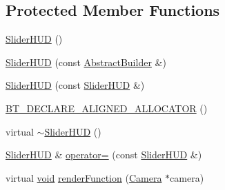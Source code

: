 \subsection*{Protected Member Functions}
\begin{DoxyCompactItemize}
\item 
\mbox{\hyperlink{classnjli_1_1_slider_h_u_d_a8cc2cb200f5a52bd7f4d5f1520a08524}{Slider\+H\+UD}} ()
\item 
\mbox{\hyperlink{classnjli_1_1_slider_h_u_d_a2ea762c03a7585d4e5c6d2aa3a23692a}{Slider\+H\+UD}} (const \mbox{\hyperlink{classnjli_1_1_abstract_builder}{Abstract\+Builder}} \&)
\item 
\mbox{\hyperlink{classnjli_1_1_slider_h_u_d_adb10bba5954a63dc1b6c0a0c22b41899}{Slider\+H\+UD}} (const \mbox{\hyperlink{classnjli_1_1_slider_h_u_d}{Slider\+H\+UD}} \&)
\item 
\mbox{\hyperlink{classnjli_1_1_slider_h_u_d_a7804e6f55bef27c234667ab64595acca}{B\+T\+\_\+\+D\+E\+C\+L\+A\+R\+E\+\_\+\+A\+L\+I\+G\+N\+E\+D\+\_\+\+A\+L\+L\+O\+C\+A\+T\+OR}} ()
\item 
virtual \mbox{\hyperlink{classnjli_1_1_slider_h_u_d_a64da41c2529ad0863638117b9749fec4}{$\sim$\+Slider\+H\+UD}} ()
\item 
\mbox{\hyperlink{classnjli_1_1_slider_h_u_d}{Slider\+H\+UD}} \& \mbox{\hyperlink{classnjli_1_1_slider_h_u_d_a67c6e29fd346f8e303dc477682f0dcf8}{operator=}} (const \mbox{\hyperlink{classnjli_1_1_slider_h_u_d}{Slider\+H\+UD}} \&)
\item 
virtual \mbox{\hyperlink{_thread_8h_af1e856da2e658414cb2456cb6f7ebc66}{void}} \mbox{\hyperlink{classnjli_1_1_slider_h_u_d_abb2dd1860a2ae905408275a8bdad484c}{render\+Function}} (\mbox{\hyperlink{classnjli_1_1_camera}{Camera}} $\ast$camera)
\end{DoxyCompactItemize}
